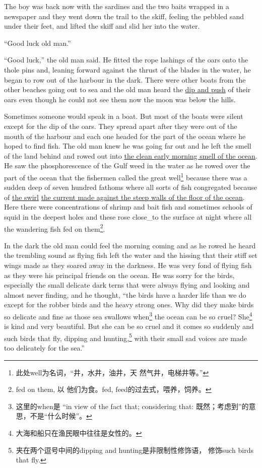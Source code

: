 The boy was back now with the sardines and the two baits wrapped in a
newspaper and they went down the \gls{trail} to the skiff, feeling the
\gls{pebbled} sand under their feet, and \gls{lifted} the skiff and
\gls{slid} her into the water.

``Good luck old man.''

``Good luck,'' the old man said. He fitted the rope \glspl{lashing} of the
\glspl{oar} onto the \gls{thole}
\glspl{pin} and, \gls{leaning} forward against the \gls{thrust} of the
\glspl{blade} in the water, he began to row out of the harbour in the dark.
There were other boats from the other beaches going out to sea and the old
man heard the \uline{\gls{dip} and push} of their oars even though he could
not see them now the moon was below the hills.

Sometimes someone would speak in a boat. But most of the boats were silent
except for the \gls{dip} of the oars. They spread \gls{apart} after they
were out of the mouth of the harbour and each one headed for the part of the
ocean where he hoped to find fish. The old man knew he was going far out and
he left the smell of the land behind and rowed out into \uline{the clean
  early morning smell of the ocean}. He saw the \gls{phosphorescence} of the
Gulf weed in the water as he rowed over the part of the ocean that the
fishermen called the great well\footnote{此处well为名词，“井，水井，油井，天
  然气井，电梯井等。”} because there was a \gls{sudden} deep of seven
hundred \glspl{fathom} where all sorts of fish \gls{congregated} because of
\uline{the \gls{swirl}} \uline{the current made against the \gls{steep}
  walls of the floor of the ocean}. Here there were \glspl{concentration} of
\gls{shrimp} and bait fish and sometimes \glspl{school} of \gls{squid} in
the deepest holes and these \gls{rose} \gls{close_to} the \gls{surface} at
night where all the \gls{wandering} fish fed on them\footnote{fed on them, 以
  他们为食。fed, feed的过去式，喂养，饲养。}.

In the dark the old man could feel the morning coming and as he rowed he
heard the \gls{trembling} sound as flying fish left the water and the
\gls{hissing} that their \gls{stiff} set \glspl{wing} made as they
\gls{soared} away in the darkness. He was very \gls{fond} of flying fish as
they were his \gls{principal} friends on the ocean. He was \gls{sorry} for
the birds, especially the small \gls{delicate} dark \glspl{tern} that were
always flying and looking and almost never finding, and he thought, ``the
birds have a harder life than we do except for the \gls{robber} birds and
the heavy strong ones. Why did they make birds so delicate and fine as those
sea \glspl{swallow} when\footnote{这里的when是 “in view of the fact that;
  considering that: 既然；考虑到”的意思，不是“什么时候”。} the ocean can
be so \gls{cruel}? She\footnote{大海和船只在渔民眼中往往是女性的。} is kind and very beautiful. But she can be so cruel
and it comes so suddenly and such birds that fly, dipping and
\gls{hunting},\footnote{夹在两个逗号中间的dipping and hunting是非限制性修饰语，
  修饰such birds that fly.} with their small sad voices are made too
\gls{delicately} for the sea.''

